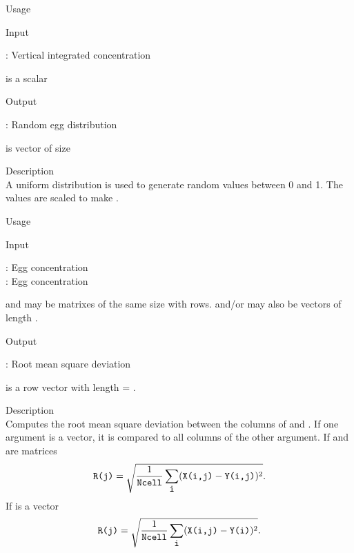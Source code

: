 {

\begin{tdesc}
\item[Usage] 
\item[Input]
  \begin{vartab}
      \>  : \> Vertical integrated concentration \> [eggs/m$^2$]
  \end{vartab}
   is a scalar
\item[Output]
  \begin{vartab}
      \>  : \>  Random egg distribution \> [eggs/m$^3$]
  \end{vartab}
   is vector of size \edb{[Ncell 1]}
 
\item[Description]\mbox{}\\
  A uniform distribution is used to generate random 
  values between 0 and 1. The values are scaled
  to make .
\end{tdesc}



\begin{tdesc}
\item[Usage] 
\item[Input]
  \begin{vartab}
   \> : \> Egg concentration  \>  [eggs/m$^3$] \\
   \> : \> Egg concentration  \>  [eggs/m$^3$]
  \end{vartab}
   and  may be matrixes of the same size
  with  rows.  and/or  may also be
  vectors of length .
\item[Output]
  \begin{vartab}
   \>  : \> Root mean square deviation \> [eggs/m$^3$]
  \end{vartab}
   is a row vector with length =
  .
\item[Description]\mbox{}\\
  Computes the root mean square deviation 
  between the columns of  and . If one
  argument is a vector, it is compared to
  all columns of the other argument.
  If  and  are matrices
  \begin{displaymath}
    {\mbox{\texttt{R(j)}}} =
    \sqrt{\frac{1}{{\mbox{\texttt{Ncell}}}} \sum_{\mbox{\texttt{i}}} ({\mbox{\texttt{X(i,j)}}}-{\mbox{\texttt{Y(i,j)}}})^2} .
  \end{displaymath}
  If  is a vector
  \begin{displaymath}
    {\mbox{\texttt{R(j)}}} = 
    \sqrt{\frac{1}{{\mbox{\texttt{Ncell}}}} \sum_{\mbox{\texttt{i}}} ({\mbox{\texttt{X(i,j)}}}-{\mbox{\texttt{Y(i)}}})^2} .
  \end{displaymath}
\end{tdesc}


}

